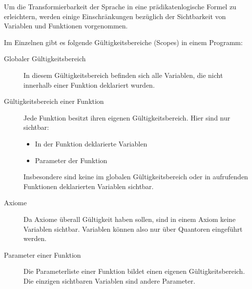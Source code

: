 Um die Transformierbarkeit der Sprache in eine prädikatenlogische Formel zu erleichtern, werden einige Einschränkungen bezüglich der Sichtbarkeit von Variablen und Funktionen vorgenommen.

Im Einzelnen gibt es folgende Gültigkeitsbereiche (Scopes) in einem Programm:

\begin{description}
	\item[Globaler Gültigkeitsbereich] In diesem Gültigkeitsbereich befinden sich alle Variablen, die nicht innerhalb einer Funktion deklariert wurden.
	\item[Gültigkeitsbereich einer Funktion] Jede Funktion besitzt ihren eigenen Gültigkeitsbereich. Hier sind nur sichtbar: \begin{itemize}
		\item In der Funktion deklarierte Variablen
		\item Parameter der Funktion
	\end{itemize}
	Insbesondere sind keine im globalen Gültigkeitsbereich oder in aufrufenden Funktionen deklarierten Variablen sichtbar.
	\item[Axiome] Da Axiome überall Gültigkeit haben sollen, sind in einem Axiom keine Variablen sichtbar. Variablen können also nur über Quantoren eingeführt werden.
	\item[Parameter einer Funktion] Die Parameterliste einer Funktion bildet einen eigenen Gültigkeitsbereich. Die einzigen sichtbaren Variablen sind andere Parameter.
\end{description}



